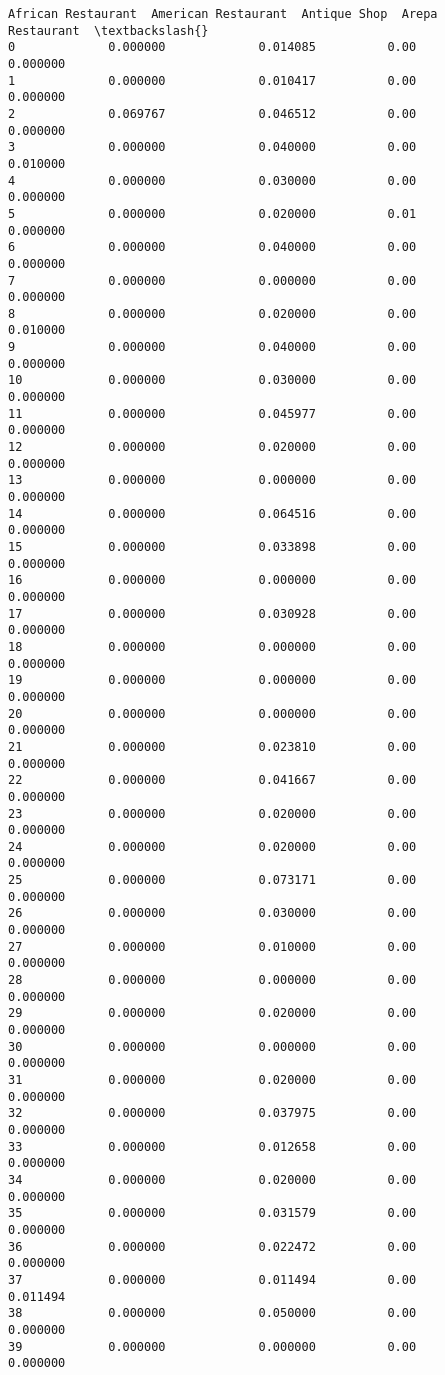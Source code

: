 \documentclass[11pt]{article}
\begin{document}
\begin{tcolorbox}[breakable, size=fbox, boxrule=.5pt, pad at break*=1mm, opacityfill=0]
\begin{Verbatim}[commandchars=\\\{\}]
    African Restaurant  American Restaurant  Antique Shop  Arepa Restaurant  \textbackslash{}
0             0.000000             0.014085          0.00          0.000000
1             0.000000             0.010417          0.00          0.000000
2             0.069767             0.046512          0.00          0.000000
3             0.000000             0.040000          0.00          0.010000
4             0.000000             0.030000          0.00          0.000000
5             0.000000             0.020000          0.01          0.000000
6             0.000000             0.040000          0.00          0.000000
7             0.000000             0.000000          0.00          0.000000
8             0.000000             0.020000          0.00          0.010000
9             0.000000             0.040000          0.00          0.000000
10            0.000000             0.030000          0.00          0.000000
11            0.000000             0.045977          0.00          0.000000
12            0.000000             0.020000          0.00          0.000000
13            0.000000             0.000000          0.00          0.000000
14            0.000000             0.064516          0.00          0.000000
15            0.000000             0.033898          0.00          0.000000
16            0.000000             0.000000          0.00          0.000000
17            0.000000             0.030928          0.00          0.000000
18            0.000000             0.000000          0.00          0.000000
19            0.000000             0.000000          0.00          0.000000
20            0.000000             0.000000          0.00          0.000000
21            0.000000             0.023810          0.00          0.000000
22            0.000000             0.041667          0.00          0.000000
23            0.000000             0.020000          0.00          0.000000
24            0.000000             0.020000          0.00          0.000000
25            0.000000             0.073171          0.00          0.000000
26            0.000000             0.030000          0.00          0.000000
27            0.000000             0.010000          0.00          0.000000
28            0.000000             0.000000          0.00          0.000000
29            0.000000             0.020000          0.00          0.000000
30            0.000000             0.000000          0.00          0.000000
31            0.000000             0.020000          0.00          0.000000
32            0.000000             0.037975          0.00          0.000000
33            0.000000             0.012658          0.00          0.000000
34            0.000000             0.020000          0.00          0.000000
35            0.000000             0.031579          0.00          0.000000
36            0.000000             0.022472          0.00          0.000000
37            0.000000             0.011494          0.00          0.011494
38            0.000000             0.050000          0.00          0.000000
39            0.000000             0.000000          0.00          0.000000


\end{Verbatim}
\end{tcolorbox}
\end{document}
